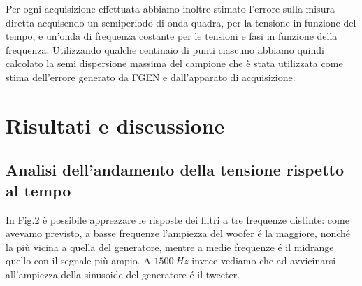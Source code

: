 \documentclass[]{article}
\begin{document}
\hspace*{\parindent}Per ogni acquisizione effettuata abbiamo inoltre stimato l'errore sulla misura diretta acquisendo un semiperiodo di onda quadra, per la tensione in funzione del tempo, e un'onda di frequenza costante per le tensioni e fasi in funzione della frequenza. Utilizzando qualche centinaio di punti ciascuno abbiamo quindi calcolato la semi dispersione massima del campione che è stata utilizzata come stima dell'errore generato da FGEN e dall'apparato di acquisizione.\newpage
\section{Risultati e discussione}

\subsection{Analisi dell'andamento della tensione rispetto al tempo}
\hspace*{\parindent}In Fig.2 è possibile apprezzare le risposte dei filtri a tre frequenze distinte: come avevamo previsto, a basse frequenze l'ampiezza del woofer é la maggiore, nonché la più vicina a quella del generatore, mentre a medie frequenze é il midrange quello con il segnale più ampio. A $ 1500\: Hz$ invece vediamo che ad avvicinarsi all'ampiezza della sinusoide del generatore é il tweeter.\\
\end{document}
